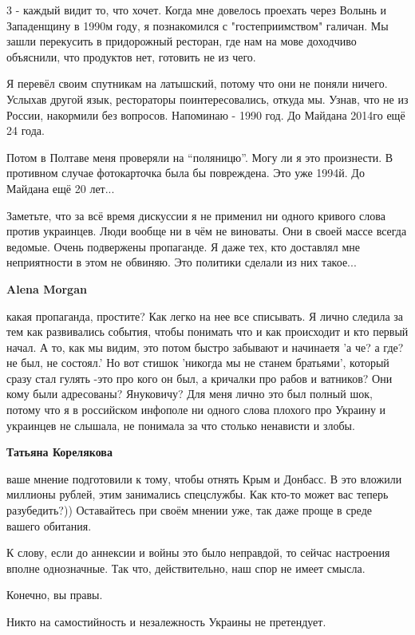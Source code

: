 \begin{itemize}
\begin{itemize}
3 - каждый видит то, что хочет. Когда мне довелось проехать через Волынь и
Западенщину в 1990м году, я познакомился с "гостеприимством" галичан. Мы зашли
перекусить в придорожный ресторан, где нам на мове доходчиво объяснили, что
продуктов нет, готовить не из чего. 

Я перевёл своим спутникам на латышский, потому что они не поняли ничего.
Услыхав другой язык, рестораторы поинтересовались, откуда мы. Узнав, что не из
России, накормили без вопросов.  Напоминаю - 1990 год. До Майдана 2014го ещё 24
года. 

Потом в Полтаве меня
проверяли на \enquote{поляницю}. Могу ли я это произнести. В противном случае
фотокарточка была бы повреждена. Это уже 1994й. До Майдана ещё 20 лет...

Заметьте, что за всё время дискуссии я не применил ни одного кривого слова
против украинцев. Люди вообще ни в чём не виноваты. Они в своей массе всегда
ведомые. Очень подвержены пропаганде. Я даже тех, кто доставлял мне
неприятности в этом не обвиняю. Это политики сделали из них такое...

\textbf{Alena Morgan} 

какая пропаганда, простите? Как легко на нее все списывать. Я лично следила за
тем как развивались события, чтобы понимать что и как происходит и кто первый
начал. А то, как мы видим, это потом быстро забывают и начинаетя 'а че? а где? не
был, не состоял.' Но вот стишок 'никогда мы не станем братьями', который сразу
стал гулять -это про кого он был, а кричалки про рабов и ватников? Они кому
были адресованы? Януковичу? Для меня лично это был полный шок, потому что я в
российском инфополе ни одного слова плохого про Украину и украинцев не
слышала, не понимала за что столько ненависти и злобы.

\textbf{Татьяна Корелякова} 

ваше мнение подготовили к тому, чтобы отнять Крым и Донбасс. В это вложили
миллионы рублей, этим занимались спецслужбы. Как кто-то может вас теперь
разубедить?)) Оставайтесь при своём мнении уже, так даже проще в среде вашего
обитания.

К слову, если до аннексии и войны это было неправдой, то сейчас настроения
вполне однозначные. Так что, действительно, наш спор не имеет смысла.


Конечно, вы правы.

Никто на самостийность и незалежность Украины не претендует.


\end{itemize}
\end{itemize}
